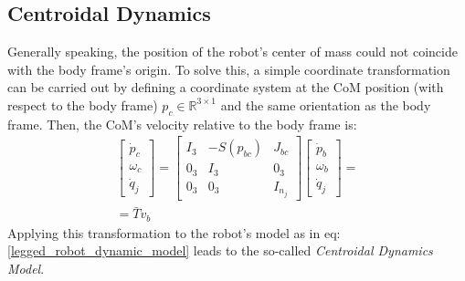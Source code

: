 \subsection{Centroidal Dynamics}
Generally speaking, the position of the robot's center of mass could not coincide with the body frame's origin. To solve this, a simple coordinate transformation can be carried out by defining a coordinate system at the CoM position (with respect to the body frame)  $p_c\in\mathbb{R}^{3\times1}$ and the same orientation as the body frame. Then, the CoM's velocity relative to the body frame is:
\begin{gather}
    \begin{bmatrix}
        \dot{p}_c \\ \omega_c \\ \dot{q}_j
    \end{bmatrix}=
    \begin{bmatrix}
        I_3 & -S(p_{bc}) & J_{bc}\\
        0_3 & I_3 & 0_3\\
        0_3 & 0_3 & I_{n_j}
    \end{bmatrix}
    \begin{bmatrix}
        \dot{p}_b \\ \omega_b \\ \dot{q}_j
    \end{bmatrix}=\\
    =\bar{T}v_b
\end{gather}
Applying this transformation to the robot's model as in eq:\ref{legged_robot_dynamic_model} leads to the so-called \textit{Centroidal Dynamics Model}.
